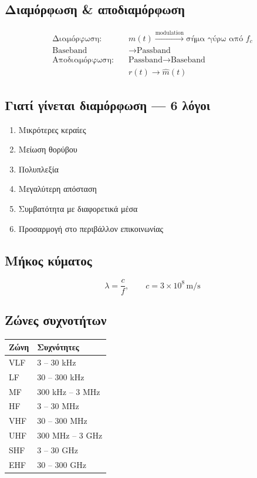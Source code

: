 \documentclass[11pt,a4paper]{article}
\begin{document}
\subsection{Διαμόρφωση \& αποδιαμόρφωση}

\begin{align}
\text{Διαμόρφωση:} \quad & m(t) \xrightarrow{\text{modulation}} \text{σήμα γύρω από } f_c \\
\text{Baseband} &\to \text{Passband} \\
\text{Αποδιαμόρφωση:} \quad & \text{Passband} \to \text{Baseband} \\
& r(t) \to \hat{m}(t)
\end{align}

\subsection{Γιατί γίνεται διαμόρφωση — 6 λόγοι}
\begin{enumerate}[leftmargin=*]
\item Μικρότερες κεραίες
\item Μείωση θορύβου
\item Πολυπλεξία
\item Μεγαλύτερη απόσταση
\item Συμβατότητα με διαφορετικά μέσα
\item Προσαρμογή στο περιβάλλον επικοινωνίας
\end{enumerate}

\subsection{Μήκος κύματος}

\begin{equation}
\lambda = \frac{c}{f}, \qquad c = 3 \times 10^8\,\mathrm{m/s}
\end{equation}

\subsection{Ζώνες συχνοτήτων}

\begin{center}
\begin{tabular}{@{}ll@{}}
\toprule
\textbf{Ζώνη} & \textbf{Συχνότητες} \\
\midrule
VLF & 3 -- 30 kHz \\
LF  & 30 -- 300 kHz \\
MF  & 300 kHz -- 3 MHz \\
HF  & 3 -- 30 MHz \\
VHF & 30 -- 300 MHz \\
UHF & 300 MHz -- 3 GHz \\
SHF & 3 -- 30 GHz \\
EHF & 30 -- 300 GHz \\
\bottomrule
\end{tabular}
\end{center}
\end{document}

